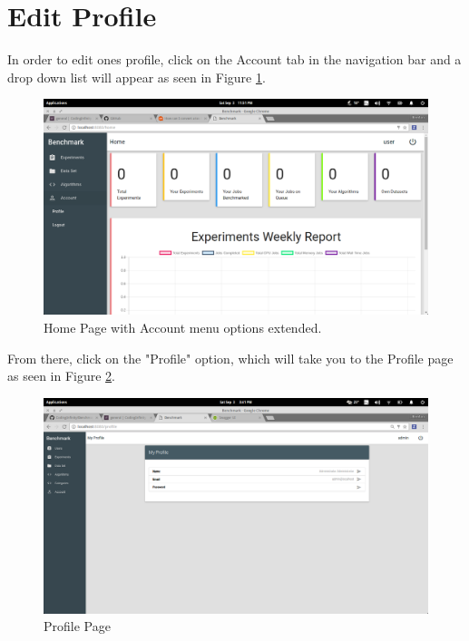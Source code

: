 \documentclass[11pt,a4paper]{article}
\begin{document}
\section{Edit Profile}
In order to edit ones profile, click on the Account tab in the navigation bar and a drop down list will appear as seen in Figure \ref{fig:AccountPage}.
\begin{figure}[H]
	\begin{center}
		\includegraphics[scale=0.3]{../Images/User Manual/Account Page.png}
		\caption{Home Page with Account menu options extended.}
		\label{fig:AccountPage}
	\end{center}  
\end{figure}
\clearpage From there, click on the "Profile" option, which will take you to the Profile page as seen in Figure \ref{fig:ProfilePage}.
\begin{figure}[H]
	\begin{center}
		\includegraphics[scale=0.3]{../Images/User Manual/Profile Page.png}
		\caption{Profile Page}
		\label{fig:ProfilePage}
	\end{center}  
\end{figure}
\end{document}
